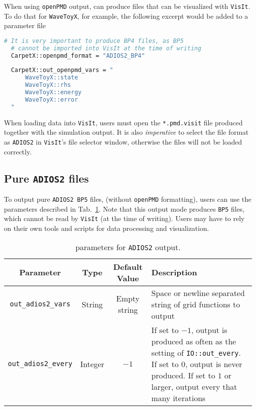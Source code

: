 When using \texttt{openPMD} output, \CarpetX\space can produce files that can be visualized with \texttt{VisIt}. To do that for \texttt{WaveToyX}, for example, the following excerpt would be added to a parameter file

\begin{lstlisting}[language=bash]
  # It is very important to produce BP4 files, as BP5
  # cannot be imported into VisIt at the time of writing
  CarpetX::openpmd_format = "ADIOS2_BP4"
  
  CarpetX::out_openpmd_vars = "
      WaveToyX::state
      WaveToyX::rhs
      WaveToyX::energy
      WaveToyX::error
  "
\end{lstlisting}

When loading data into \texttt{VisIt}, users must open the \texttt{*.pmd.visit} file produced together with the simulation output. It is also \textit{imperative} to select the file format as \texttt{ADIOS2} in \texttt{VisIt}'s file selector window, otherwise the files will not be loaded correctly.

\subsection{Pure \texttt{ADIOS2} files}

To output pure \texttt{ADIOS2 BP5} files, (without \texttt{openPMD} formatting), users can use the parameters described in Tab.~\ref{tab:adios2_params}. Note that this output mode produces \texttt{BP5} files, which cannot be read by \texttt{VisIt} (at the time of writing). Users may have to rely on their own tools and scripts for data processing and visualization.

\begin{table}[ht]
  \centering
  \begin{tabularx}{\textwidth}{cccX}
    Parameter                 & Type    & Default Value  & Description \\\hline\hline
    \texttt{out\_adios2\_vars}  & String  & Empty string   & Space or newline separated string of grid functions to output \\
    \texttt{out\_adios2\_every} & Integer & $-1$           & If set to $-1$, output is produced as often as the setting of \texttt{IO::out\_every}. If set to $0$, output is never produced. If set to $1$ or larger, output every that many iterations \\\hline\hline
  \end{tabularx}
  \label{tab:adios2_params}
  \caption{\CarpetX\space parameters for \texttt{ADIOS2} output.}
\end{table}

